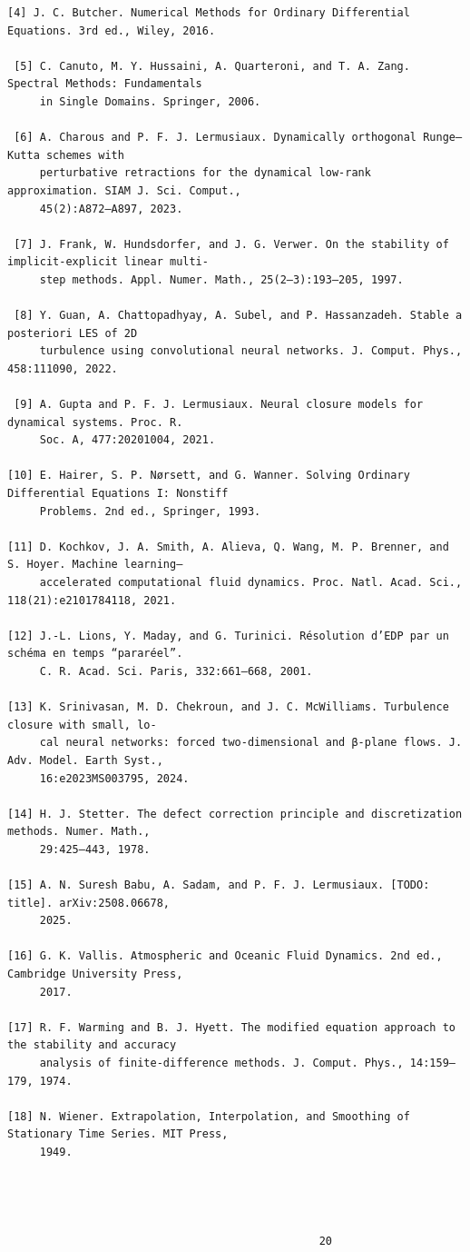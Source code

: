 \documentclass[letterpaper]{article}
\begin{document}
\begin{Verbatim}[fontsize=\fontsize{6.35}{7.15}\selectfont,breaklines=false]
 [4] J. C. Butcher. Numerical Methods for Ordinary Differential Equations. 3rd ed., Wiley, 2016.

 [5] C. Canuto, M. Y. Hussaini, A. Quarteroni, and T. A. Zang. Spectral Methods: Fundamentals
     in Single Domains. Springer, 2006.

 [6] A. Charous and P. F. J. Lermusiaux. Dynamically orthogonal Runge–Kutta schemes with
     perturbative retractions for the dynamical low-rank approximation. SIAM J. Sci. Comput.,
     45(2):A872–A897, 2023.

 [7] J. Frank, W. Hundsdorfer, and J. G. Verwer. On the stability of implicit-explicit linear multi-
     step methods. Appl. Numer. Math., 25(2–3):193–205, 1997.

 [8] Y. Guan, A. Chattopadhyay, A. Subel, and P. Hassanzadeh. Stable a posteriori LES of 2D
     turbulence using convolutional neural networks. J. Comput. Phys., 458:111090, 2022.

 [9] A. Gupta and P. F. J. Lermusiaux. Neural closure models for dynamical systems. Proc. R.
     Soc. A, 477:20201004, 2021.

[10] E. Hairer, S. P. Nørsett, and G. Wanner. Solving Ordinary Differential Equations I: Nonstiff
     Problems. 2nd ed., Springer, 1993.

[11] D. Kochkov, J. A. Smith, A. Alieva, Q. Wang, M. P. Brenner, and S. Hoyer. Machine learning–
     accelerated computational fluid dynamics. Proc. Natl. Acad. Sci., 118(21):e2101784118, 2021.

[12] J.-L. Lions, Y. Maday, and G. Turinici. Résolution d’EDP par un schéma en temps “pararéel”.
     C. R. Acad. Sci. Paris, 332:661–668, 2001.

[13] K. Srinivasan, M. D. Chekroun, and J. C. McWilliams. Turbulence closure with small, lo-
     cal neural networks: forced two-dimensional and β-plane flows. J. Adv. Model. Earth Syst.,
     16:e2023MS003795, 2024.

[14] H. J. Stetter. The defect correction principle and discretization methods. Numer. Math.,
     29:425–443, 1978.

[15] A. N. Suresh Babu, A. Sadam, and P. F. J. Lermusiaux. [TODO: title]. arXiv:2508.06678,
     2025.

[16] G. K. Vallis. Atmospheric and Oceanic Fluid Dynamics. 2nd ed., Cambridge University Press,
     2017.

[17] R. F. Warming and B. J. Hyett. The modified equation approach to the stability and accuracy
     analysis of finite-difference methods. J. Comput. Phys., 14:159–179, 1974.

[18] N. Wiener. Extrapolation, Interpolation, and Smoothing of Stationary Time Series. MIT Press,
     1949.




                                                20
\end{Verbatim}
\end{document}
